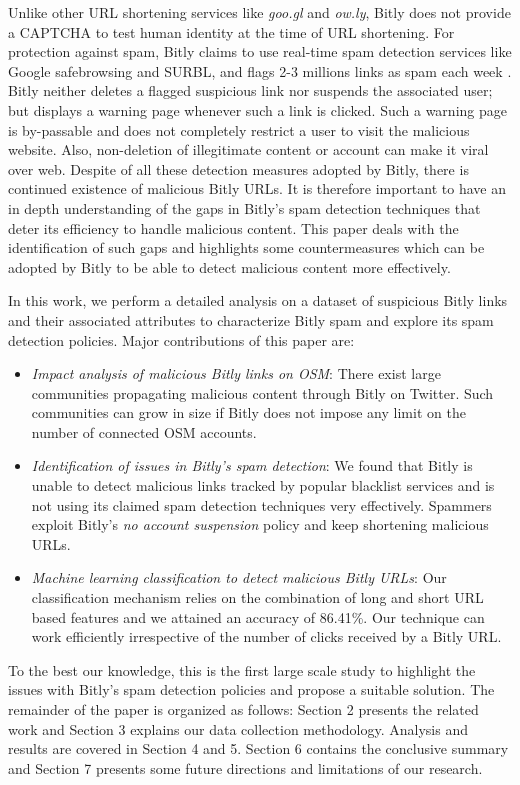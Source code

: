 \documentclass[conference]{IEEEtran}
\begin{document}
Unlike other URL shortening services like \textit{goo.gl} and \textit{ow.ly}, Bitly does not provide a CAPTCHA to test human identity at the time of URL shortening. For protection against spam, Bitly claims to use real-time spam detection services like Google safebrowsing and SURBL, and flags 2-3 millions links as spam each week \cite{23,24,26}. Bitly neither deletes a flagged suspicious link nor suspends the associated user; but displays a warning page whenever such a link is clicked. Such a warning page is by-passable and does not completely restrict a user to visit the malicious website. Also, non-deletion of illegitimate content or account can make it viral over web. Despite of all these detection measures adopted by Bitly, there is continued existence of malicious Bitly URLs. It is therefore important to have an in depth understanding of the gaps in Bitly's spam detection techniques that deter its efficiency to handle malicious content. This paper deals with the identification of such gaps and highlights some countermeasures which can be adopted by Bitly to be able to detect malicious content more effectively.


In this work, we perform a detailed analysis on a dataset of suspicious Bitly links and their associated attributes to characterize Bitly spam and explore its spam detection policies. Major contributions of this paper are:
\begin{itemize}[leftmargin=0.4cm]
\item \textit{Impact analysis of malicious Bitly links on OSM}: There exist large communities propagating malicious content through Bitly on Twitter. Such communities can grow in size if Bitly does not impose any limit on the number of connected OSM accounts. 
\item \textit{Identification of issues in Bitly's spam detection}: We found that Bitly is unable to detect malicious links tracked by popular blacklist services and is not using its claimed spam detection techniques very effectively. Spammers exploit Bitly's \textit{no account suspension} policy and keep shortening malicious URLs. 
\item \textit{Machine learning classification to detect malicious Bitly URLs}: Our classification mechanism relies on the combination of long and short URL based features and we attained an accuracy of 86.41\%. Our technique can work efficiently irrespective of the number of clicks received by a Bitly URL.
\end{itemize}
To the best our knowledge, this is the first large scale study to highlight the issues with Bitly's spam detection policies and propose a suitable solution.
The remainder of the paper is organized as follows: Section 2 presents the related work and Section 3 explains our data collection methodology. Analysis and results are covered in Section 4 and 5. Section 6 contains the conclusive summary and Section 7 presents some future directions and limitations of our research.
\end{document}
